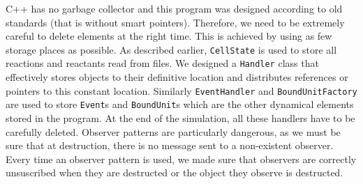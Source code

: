 C++ has no garbage collector and this program was designed according to old standards (that is without smart pointers). Therefore, we need to be extremely careful to delete elements at the right time. This is achieved by using as few storage places as possible. As described earlier, \texttt{CellState} is used to store all reactions and reactants read from files. We designed a \texttt{Handler} class that effectively stores objects to their definitive location and distributes references or pointers to this constant location. Similarly \texttt{EventHandler} and \texttt{BoundUnitFactory} are used to store \texttt{Event}s and \texttt{BoundUnit}s which are the other dynamical elements stored in the program. At the end of the simulation, all these handlers have to be carefully deleted. Observer patterns are particularly dangerous, as we must be sure that at destruction, there is no message sent to a non-existent observer. Every time an observer pattern is used, we made sure that observers are correctly unsuscribed when they are destructed or the object they observe is destructed.
